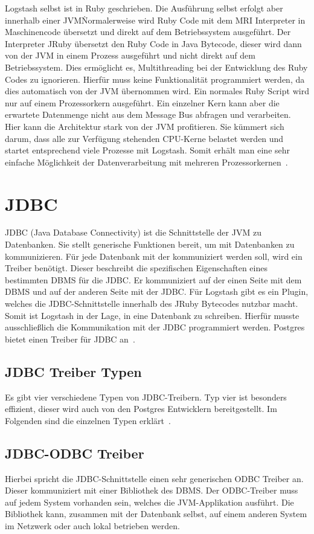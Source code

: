 Logstash selbst ist in Ruby geschrieben. Die Ausführung selbst erfolgt aber
innerhalb einer JVM\. Normalerweise wird Ruby Code mit dem \gls{MRI}
Interpreter in Maschinencode übersetzt und direkt auf dem Betriebssystem
ausgeführt. Der Interpreter JRuby übersetzt den Ruby Code in Java Bytecode,
dieser wird dann von der JVM in einem Prozess ausgeführt und nicht direkt auf
dem Betriebssystem. Dies ermöglicht es, Multithreading bei der Entwicklung des
Ruby Codes zu ignorieren. Hierfür muss keine Funktionalität programmiert
werden, da dies automatisch von der JVM übernommen wird. Ein normales Ruby
Script wird nur auf einem Prozessorkern ausgeführt. Ein einzelner Kern kann
aber die erwartete Datenmenge nicht aus dem Message Bus abfragen und
verarbeiten. Hier kann die Architektur stark von der JVM profitieren. Sie
kümmert sich darum, dass alle zur Verfügung stehenden CPU-Kerne belastet werden
und startet entsprechend viele Prozesse mit Logstash. Somit erhält man eine
sehr einfache Möglichkeit der Datenverarbeitung mit mehreren
Prozessorkernen~\cite{jruby}.
\tm%

\section{JDBC}
\gls{JDBC} (Java Database Connectivity) ist die Schnittstelle der JVM zu
Datenbanken. Sie stellt generische Funktionen bereit, um mit Datenbanken zu
kommunizieren. Für jede Datenbank mit der kommuniziert werden soll, wird ein
Treiber benötigt. Dieser beschreibt die spezifischen Eigenschaften eines
bestimmten \gls{DBMS} für die JDBC\@. Er kommuniziert auf der einen Seite mit
dem DBMS und auf der anderen Seite mit der JDBC\@. Für Logstash gibt es ein
Plugin, welches die JDBC-Schnittstelle innerhalb des JRuby Bytecodes nutzbar
macht. Somit ist Logstash in der Lage, in eine Datenbank zu schreiben. Hierfür
musste ausschließlich die Kommunikation mit der JDBC programmiert werden.
Postgres bietet einen Treiber für JDBC an~\cite{postgres-jdbc}.
\tm%

\subsection{JDBC Treiber Typen}
Es gibt vier verschiedene Typen von JDBC-Treibern. Typ vier ist besonders
effizient, dieser wird auch von den Postgres Entwicklern bereitgestellt. Im
Folgenden sind die einzelnen Typen erklärt~\cite{jdbc-types}.

\subsection{JDBC-ODBC Treiber}
Hierbei spricht die JDBC-Schnittstelle einen sehr generischen \gls{ODBC}
Treiber an. Dieser kommuniziert mit einer Bibliothek des DBMS\@. Der
ODBC-Treiber muss auf jedem System vorhanden sein, welches die JVM-Applikation
ausführt. Die Bibliothek kann, zusammen mit der Datenbank selbst, auf einem
anderen System im Netzwerk oder auch lokal betrieben werden.

